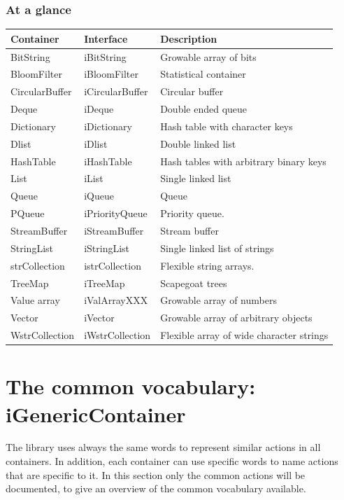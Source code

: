 \documentclass[12pt,a4paper]{memoir} %
\begin{document}
\subsection{At a glance}
{
\begin{center}
\noindent
\begin{longtable}{||p{3cm}|p{3cm}|p{7.0cm}||}
\hline
\textbf{Container}&\textbf{Interface}&\textbf{Description }\\\hline \hline
BitString&iBitString&Growable array of bits \\
BloomFilter&iBloomFilter&Statistical container \\
CircularBuffer&iCircularBuffer& Circular buffer \\
Deque&iDeque&Double ended queue \\
Dictionary&iDictionary&Hash table with character keys \\
Dlist&iDlist&Double linked list \\
HashTable&iHashTable&Hash tables with arbitrary binary keys \\
List&iList&Single linked list \\
Queue&iQueue&Queue \\
PQueue&iPriorityQueue&Priority queue. \\
StreamBuffer&iStreamBuffer&Stream buffer \\
StringList&iStringList&Single linked list of strings\\
strCollection&istrCollection&Flexible string arrays. \\
TreeMap&iTreeMap&Scapegoat trees \\
Value array&iValArrayXXX&Growable array of numbers \\
Vector&iVector&Growable array of arbitrary objects \\
WstrCollection&iWstrCollection&Flexible array of wide character strings\\
\hline
\end{longtable}
\end{center}
} %
\chapter{The common vocabulary: iGenericContainer}
The library uses always the same words to represent similar actions in all containers. In addition, each container can use specific words to name actions that are specific to it. In this section only the common actions will be documented, to give an overview of the common vocabulary available.
\end{document}
